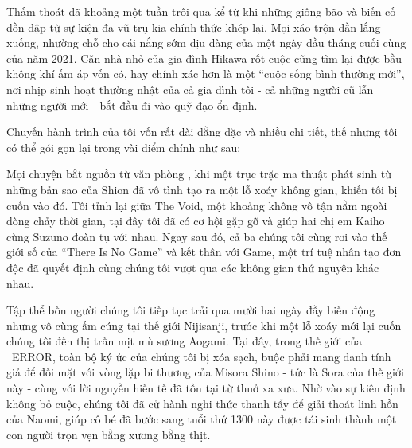 \documentclass[../main.tex]{subfiles}
\begin{document}


Thấm thoát đã khoảng một tuần trôi qua kể từ khi những giông bão và biến cố dồn dập từ sự kiện đa vũ trụ kia chính thức khép lại. Mọi xáo trộn dần lắng xuống, nhường chỗ cho cái nắng sớm dịu dàng của một ngày đầu tháng cuối cùng của năm 2021. Căn nhà nhỏ của gia đình Hikawa rốt cuộc cũng tìm lại được bầu không khí ấm áp vốn có, hay chính xác hơn là một ``cuộc sống bình thường mới'', nơi nhịp sinh hoạt thường nhật của cả gia đình tôi - cả những người cũ lẫn những người mới - bắt đầu đi vào quỹ đạo ổn định.

Chuyến hành trình của tôi vốn rất dài dằng dặc và nhiều chi tiết, thế nhưng tôi có thể gói gọn lại trong vài điểm chính như sau:

Mọi chuyện bắt nguồn từ văn phòng \hll, khi một trục trặc ma thuật phát sinh từ những bản sao của Shion đã vô tình tạo ra một lỗ xoáy không gian, khiến tôi bị cuốn vào đó. Tôi tỉnh lại giữa The Void, một khoảng không vô tận nằm ngoài dòng chảy thời gian, tại đây tôi đã có cơ hội gặp gỡ và giúp hai chị em Kaiho cùng Suzuno đoàn tụ với nhau. Ngay sau đó, cả ba chúng tôi cùng rơi vào thế giới số của ``There Is No Game'' và kết thân với Game, một trí tuệ nhân tạo đơn độc đã quyết định cùng chúng tôi vượt qua các không gian thứ nguyên khác nhau.

Tập thể bốn người chúng tôi tiếp tục trải qua mười hai ngày đầy biến động nhưng vô cùng ấm cúng tại thế giới Nijisanji, trước khi một lỗ xoáy mới lại cuốn chúng tôi đến thị trấn mịt mù sương Aogami. Tại đây, trong thế giới của \hll\ ERROR, toàn bộ ký ức của chúng tôi bị xóa sạch, buộc phải mang danh tính giả để đối mặt với vòng lặp bi thương của Misora Shino - tức là Sora của thế giới này - cùng với lời nguyền hiến tế đã tồn tại từ thuở xa xưa. Nhờ vào sự kiên định không bỏ cuộc, chúng tôi đã cử hành nghi thức thanh tẩy để giải thoát linh hồn của Naomi, giúp cô bé đã bước sang tuổi thứ 1300 này được tái sinh thành một con người trọn vẹn bằng xương bằng thịt.
\end{document}
